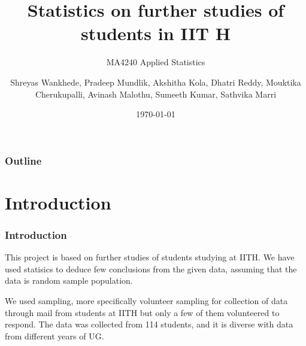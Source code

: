 \documentclass{beamer}
\title{Statistics on further studies of students in IIT H}
\subtitle{MA4240  Applied Statistics}
\author{Shreyas Wankhede, Pradeep Mundlik, Akshitha Kola, Dhatri Reddy,
    Mouktika Cherukupalli, Avinash Malothu, Sumeeth Kumar, Sathvika Marri}
\institute{Indian Institute of Technology Hyderabad}
\date{\today}
\begin{document}
\begin{frame}
    \titlepage
\end{frame}

\begin{frame}
    \frametitle{Outline}
    \tableofcontents
\end{frame}

\section{Introduction}
\begin{frame}
    \frametitle{Introduction}
    \begin{block}{}
        This project is based on further studies of students studying at IITH.
        We
        have used statisics to deduce few conclusions from the given data,
        assuming
        that the data is random sample population.
    \end{block}

    \begin{block}{}
        We used sampling, more specifically volunteer sampling for collection
        of data
        through mail from students at IITH but only a few of them volunteered
        to
        respond. The data was collected from 114 students, and it is diverse
        with data
        from different years of UG.
    \end{block}

\end{frame}
\end{document}
